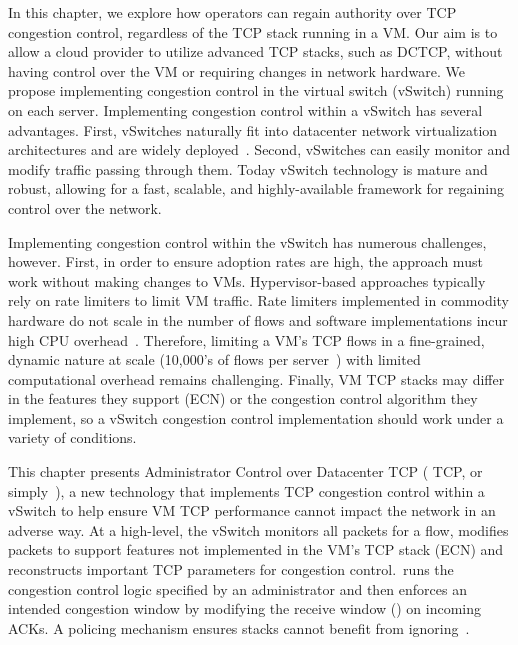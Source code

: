 In this chapter, we explore how operators can regain authority over TCP congestion control, regardless of the TCP stack
running in a VM. Our aim is to allow a cloud provider to utilize advanced TCP stacks, such as DCTCP, without having
control over the VM or requiring changes in network hardware. We propose implementing congestion control in the virtual switch
(vSwitch) running on each server. Implementing congestion control within a vSwitch has several advantages. 
First, vSwitches naturally fit into datacenter network virtualization architectures and are widely
deployed~\cite{pfaff2015design}. Second, vSwitches can easily monitor and modify traffic passing through them. 
Today vSwitch technology is mature and robust, allowing for a fast, scalable,
and highly-available framework for regaining control over the network. 


Implementing congestion control within the vSwitch has numerous challenges, however. First, in order to ensure adoption rates are high, the 
approach must work without making changes to VMs. 
Hypervisor-based approaches typically rely on rate limiters to limit VM traffic. Rate limiters implemented in
commodity hardware do not scale in the number of flows and software implementations incur high CPU overhead~\cite{radhakrishnan2014senic}. 
Therefore, limiting a VM's TCP flows in a fine-grained, dynamic nature
at scale (10,000's of flows per server~\cite{180302}) with limited computational overhead remains challenging. 
Finally, VM TCP stacks may differ in the features they support (\eg{}ECN) or the congestion
control algorithm they implement, so a vSwitch congestion control implementation should work under a variety
of conditions. 

This chapter presents Administrator Control over Datacenter TCP (\acdc{} TCP, or simply~\acdc{}), a new technology that implements 
TCP congestion control within a vSwitch to help ensure VM
TCP performance cannot impact the network in an adverse way. At a high-level, the vSwitch monitors all packets for a flow, modifies 
packets to support features not implemented in the VM's TCP stack (\eg{}ECN) and reconstructs
important TCP parameters for congestion control.~\acdc runs the congestion control logic specified by an administrator and then enforces an intended
congestion window by modifying the receive window (\rwnd{}) on incoming ACKs. A policing
mechanism ensures stacks cannot benefit from ignoring~\rwnd{}.%

